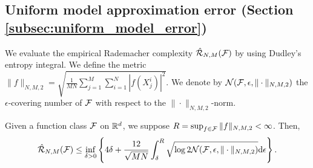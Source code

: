\subsection{Uniform model approximation error (Section \ref{subsec:uniform_model_error})}\label{subsec:uniform_model_error_proof}
We evaluate the empirical Rademacher complexity $\hat{\mathcal{R}}_{N,M}(\mathcal{F})$ by using Dudley's entropy integral. We define the metric $\|f\|_{N,M,2} = \sqrt{\frac{1}{MN}\sum_{j=1}^M\sum_{i=1}^N |f(X^i_j)|^2}$.
We denote by $\mathcal{N}(\mathcal{F},\epsilon,\|\cdot\|_{N,M,2})$ the $\epsilon$-covering number of $\mathcal{F}$ with respect to the $\|\cdot\|_{N,M,2}$-norm.
\begin{lemma}\label{lemma:dudley}
    Given a function class $\mathcal{F}$ on $\mathbb{R}^d$, we suppose $R = \sup_{f\in\mathcal{F}}\|f\|_{N,M,2} < \infty$. Then,
    \begin{equation*}
        \hat{\mathcal{R}}_{N,M}(\mathcal{F}) 
        \leq \inf_{\delta > 0} 
        \left\{
            4\delta 
            + \frac{12}{\sqrt{MN}} \int_{\delta}^{R} \sqrt{\log 2 \mathcal{N}(\mathcal{F},\epsilon,\|\cdot\|_{N,M,2})} \mathrm{d}\epsilon
        \right\}.
    \end{equation*}
\end{lemma}

